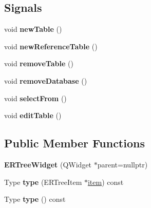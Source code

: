 \subsection*{Signals}
\begin{DoxyCompactItemize}
\item 
void {\bfseries new\+Table} ()\hypertarget{classERTreeWidget_a58c1c59c25654e89556761adb57db518}{}\label{classERTreeWidget_a58c1c59c25654e89556761adb57db518}

\item 
void {\bfseries new\+Reference\+Table} ()\hypertarget{classERTreeWidget_a04d9ccc2dac42fb658860a0211bb9d46}{}\label{classERTreeWidget_a04d9ccc2dac42fb658860a0211bb9d46}

\item 
void {\bfseries remove\+Table} ()\hypertarget{classERTreeWidget_af3713c67d63adb1b909e377b2f5f5a42}{}\label{classERTreeWidget_af3713c67d63adb1b909e377b2f5f5a42}

\item 
void {\bfseries remove\+Database} ()\hypertarget{classERTreeWidget_a0e0c49fe2dbe0e1719fee91e84c5f8af}{}\label{classERTreeWidget_a0e0c49fe2dbe0e1719fee91e84c5f8af}

\item 
void {\bfseries select\+From} ()\hypertarget{classERTreeWidget_a4c4aa16739354a4f7dc499bf7c882971}{}\label{classERTreeWidget_a4c4aa16739354a4f7dc499bf7c882971}

\item 
void {\bfseries edit\+Table} ()\hypertarget{classERTreeWidget_ace19498a48a18de9c47cf0ddc881a9d1}{}\label{classERTreeWidget_ace19498a48a18de9c47cf0ddc881a9d1}

\end{DoxyCompactItemize}
\subsection*{Public Member Functions}
\begin{DoxyCompactItemize}
\item 
{\bfseries E\+R\+Tree\+Widget} (Q\+Widget $\ast$parent=nullptr)\hypertarget{classERTreeWidget_a4cdfac985b0386a7397ccadf8ff9a856}{}\label{classERTreeWidget_a4cdfac985b0386a7397ccadf8ff9a856}

\item 
Type {\bfseries type} (E\+R\+Tree\+Item $\ast$\hyperlink{classitem}{item}) const \hypertarget{classERTreeWidget_a5a5345b4b399db8379dd424af030ae15}{}\label{classERTreeWidget_a5a5345b4b399db8379dd424af030ae15}

\item 
Type {\bfseries type} () const \hypertarget{classERTreeWidget_af3bd5caed839e908692deff27072ec88}{}\label{classERTreeWidget_af3bd5caed839e908692deff27072ec88}

\end{DoxyCompactItemize}


